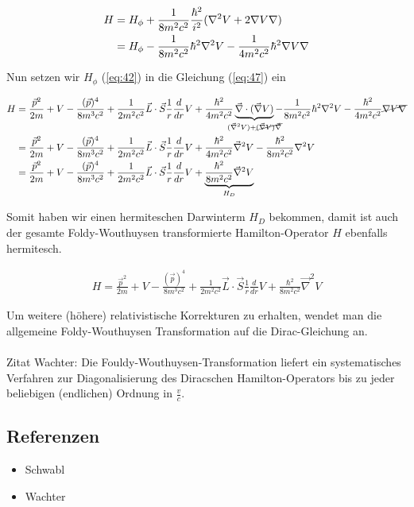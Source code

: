 \begin{align}
  \label{eq:47}
  H &= H_\phi + \frac{1}{8m^2c^2}\frac{\hbar^2}{i^2} (\nabla^2V+2\nabla V \nabla) \notag\\
&= H_\phi - \frac{1}{8m^2c^2}\hbar^2 \nabla^2V  - \frac{1}{4m^2c^2}\hbar^2\nabla V \nabla
\end{align}

Nun setzen wir \(H_\phi\) (\ref{eq:42}) in die Gleichung (\ref{eq:47}) ein

\begin{align}
  \label{eq:48}
  H &=  \frac{\vec p^2}{2m}  +V - \frac{(\vec p)^4 }{8m^3c^2}+ \frac{1 }{2m^2c^2}\vec L\cdot\vec S \frac{1}{r}\frac{d}{dr}V +  \frac{\hbar^2 }{4m^2c^2}\underbr{ \vec \nabla\cdot(\vec\nabla V)}_{(\vec \nabla^2V) + \cancel{(\vec\nabla V)\vec\nabla}} - \frac{1}{8m^2c^2}\hbar^2 \nabla^2V  - \frac{\hbar^2}{4m^2c^2}\cancel{\nabla V \nabla} \notag\\
&=  \frac{\vec p^2}{2m}  +V - \frac{(\vec p)^4 }{8m^3c^2}+ \frac{1 }{2m^2c^2}\vec L\cdot\vec S \frac{1}{r}\frac{d}{dr}V +  \frac{\hbar^2 }{4m^2c^2}\vec \nabla^2V - \frac{\hbar^2}{8m^2c^2} \nabla^2V  \notag\\
&=  \frac{\vec p^2}{2m}  +V - \frac{(\vec p)^4 }{8m^3c^2}+ \frac{1 }{2m^2c^2}\vec L\cdot\vec S \frac{1}{r}\frac{d}{dr}V + \underbr{ \frac{\hbar^2 }{8m^2c^2}\vec \nabla^2V }_{H_D} 
\end{align}

Somit haben wir einen hermiteschen Darwinterm \(H_D\) bekommen, damit ist auch der gesamte  Foldy-Wouthuysen transformierte Hamilton-Operator \(H\) ebenfalls hermitesch.

\begin{align}
  \label{eq:49}
\boxed{   H =  \frac{\vec p^2}{2m}  +V - \frac{(\vec p)^4 }{8m^3c^2}+ \frac{1 }{2m^2c^2}\vec L\cdot\vec S \frac{1}{r}\frac{d}{dr}V + \frac{\hbar^2 }{8m^2c^2}\vec \nabla^2V  }
\end{align}


Um weitere (höhere) relativistische Korrekturen zu erhalten, wendet man die allgemeine  Foldy-Wouthuysen Transformation auf die Dirac-Gleichung an.\\
\\
Zitat Wachter: Die Fouldy-Wouthuysen-Transformation liefert ein systematisches Verfahren zur Diagonalisierung des Diracschen Hamilton-Operators bis zu jeder beliebigen (endlichen) Ordnung in \(\frac{v}{c}\).\\


 

\subsection*{Referenzen}
\begin{itemize}
\item Schwabl
\item Wachter
\end{itemize}


